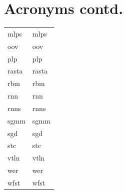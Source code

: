 \documentclass[12pt,twoside]{report}
\begin{document}
\clearpage
\begin{table}[tp]
  \label{tab:acronymns2}
\section*{Acronyms contd.}
\begin{tabular}{ll}
  \acrshort{mlps} & \acrlong{mlps} \\
  \acrshort{oov} & \acrlong{oov} \\
    \acrshort{plp} & \acrlong{plp} \\
  \acrshort{rasta} & \acrlong{rasta} \\
  \acrshort{rbm} & \acrlong{rbm} \\
  \acrshort{rnn} & \acrlong{rnn} \\
  \acrshort{rnns} & \acrlong{rnns} \\
  \acrshort{sgmm} & \acrlong{sgmm} \\
  \acrshort{sgd} & \acrlong{sgd} \\
  \acrshort{stc} & \acrlong{stc} \\
  \acrshort{vtln} & \acrlong{vtln} \\
  \acrshort{wer} & \acrlong{wer} \\
  \acrshort{wfst} & \acrlong{wfst} 
\end{tabular}
\end{table}
\clearpage
\end{document}
